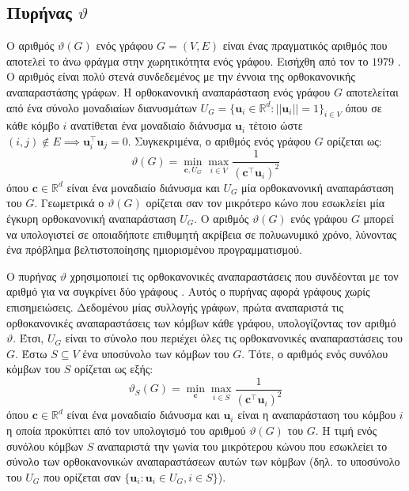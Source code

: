 \subsection{Πυρήνας  $\vartheta$}
\label{ssec:lovasz}
Ο αριθμός  $\vartheta(G)$ ενός γράφου $G=(V,E)$ είναι ένας πραγματικός αριθμός που αποτελεί το άνω φράγμα στην χωρητικότητα  ενός γράφου.
Εισήχθη από τον  το $1979$ \cite{lovasz1979shannon}.
Ο αριθμός  είναι πολύ στενά συνδεδεμένος με την έννοια της ορθοκανονικής αναπαραστάσης γράφων.
Η ορθοκανονική αναπαράσταση ενός γράφου $G$ αποτελείται από ένα σύνολο μοναδιαίων διανυσμάτων $U_G = \{ \mathbf{u}_i \in \mathbb{R}^d : || \mathbf{u}_i || = 1 \}_{i \in V}$ όπου σε κάθε κόμβο $i$ ανατίθεται ένα μοναδιαίο διάνυσμα $\mathbf{u}_i$ τέτοιο ώστε $(i,j) \not \in E \implies \mathbf{u}_i^\top \mathbf{u}_j = 0$.
Συγκεκριμένα, ο αριθμός  ενός γράφου $G$ ορίζεται ως:
\begin{equation}
    \vartheta(G) = \min_{\mathbf{c}, U_G} \max_{i \in V} \frac{1}{(\mathbf{c}^\top \mathbf{u}_i)^2}
\end{equation}
όπου $\mathbf{c} \in \mathbb{R}^d$ είναι ένα μοναδιαίο διάνυσμα και $U_G$ μία ορθοκανονική αναπαράσταση του $G$. 
Γεωμετρικά ο $\vartheta(G)$ ορίζεται σαν τον μικρότερο κώνο που εσωκλείει μία έγκυρη ορθοκανονική αναπαράσταση $U_G$.
Ο αριθμός  $\vartheta(G)$ ενός γράφου $G$ μπορεί να υπολογιστεί σε οποιαδήποτε επιθυμητή ακρίβεια σε πολυωνυμικό χρόνο, λύνοντας ένα πρόβλημα βελτιστοποίησης ημιορισμένου προγραμματισμού.

Ο πυρήνας  $\vartheta$ χρησιμοποιεί τις ορθοκανονικές αναπαραστάσεις που συνδέονται με τον αριθμό  για να συγκρίνει δύο γράφους \cite{johansson2014global}.
Αυτός ο πυρήνας αφορά γράφους χωρίς επισημειώσεις.
Δεδομένου μίας συλλογής γράφων, πρώτα αναπαριστά τις ορθοκανονικές αναπαραστάσεις των κόμβων κάθε γράφου, υπολογίζοντας τον αριθμό  $\vartheta$.
Έτσι, $U_G$ είναι το σύνολο που περιέχει όλες τις ορθοκανονικές αναπαραστάσεις του $G$.
Έστω $S \subseteq V$ ένα υποσύνολο των κόμβων του $G$.
Τότε, ο αριθμός  ενός συνόλου κόμβων του $S$ ορίζεται ως εξής:
\begin{equation}
    \vartheta_S(G) = \min_{\mathbf{c}} \max_{i \in S} \frac{1}{(\mathbf{c}^\top \mathbf{u}_i)^2}
\end{equation}
όπου $\mathbf{c} \in \mathbb{R}^d$ είναι ένα μοναδιαίο διάνυσμα και $\mathbf{u}_i$ είναι η αναπαράσταση του κόμβου $i$ η οποία προκύπτει από τον υπολογισμό του αριθμού  $\vartheta(G)$ του $G$.
Η τιμή  ενός συνόλου κόμβων $S$ αναπαριστά την γωνία του μικρότερου κώνου που εσωκλείει το σύνολο των ορθοκανονικών αναπαραστάσεων αυτών των κόμβων (δηλ. το υποσύνολο του $U_G$ που ορίζεται σαν $\{ \mathbf{u}_i : \mathbf{u}_i \in U_G, i \in S \}$).

